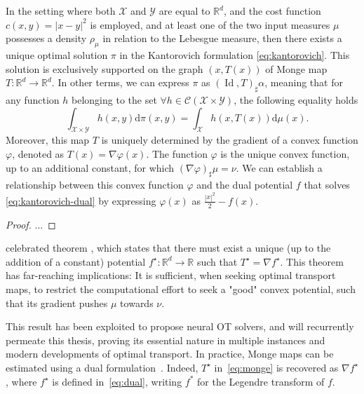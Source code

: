 \begin{theorem} \label{thm:brenier}
	In the setting where both $\mathcal{X}$ and $\mathcal{Y}$ are equal to $\mathbb{R}^d$, and the cost function $c(x, y) = |x-y|^2$ is employed, and at least one of the two input measures $\mu$ possesses a density $\rho_\mu$ in relation to the Lebesgue measure, then there exists a unique optimal solution $\pi$ in the Kantorovich formulation \eqref{eq:kantorovich}.
	This solution is exclusively supported on the graph $(x, T(x))$ of Monge map $T: \mathbb{R}^d \rightarrow \mathbb{R}^d$.
	In other terms, we can express $\pi$ as $(\operatorname{Id}, T)_{\sharp} \alpha$, meaning that for any function $h$ belonging to the set $\forall h \in \mathcal{C}(\mathcal{X} \times \mathcal{Y})$, the following equality holds
	$$
	\quad \int_{\mathcal{X} \times \mathcal{Y}} h(x, y) \mathrm{d} \pi(x, y)=\int_{\mathcal{X}} h(x, T(x)) \mathrm{d} \mu(x).
	$$
Moreover, this map $T$ is uniquely determined by the gradient of a convex function $\varphi$, denoted as $T(x)=\nabla \varphi(x)$. The function $\varphi$ is the unique convex function, up to an additional constant, for which $(\nabla \varphi)_{\sharp} \mu=\nu$. We can establish a relationship between this convex function $\varphi$ and the dual potential $f$ that solves \eqref{eq:kantorovich-dual} by expressing $\varphi(x)$ as $\frac{|x|^2}{2}-f(x)$.
\end{theorem}
\begin{proof}
	...
\end{proof}

celebrated \citeauthor{brenier1987decomposition} theorem \citeyearpar{brenier1987decomposition}, which states that there must exist  a unique (up to the addition of a constant) potential $f^\star:\mathbb{R}^d\rightarrow \mathbb{R}$ such that $T^\star = \nabla f^\star$. 
This theorem has far-reaching implications: It is sufficient, when seeking optimal transport maps, to restrict the computational effort to seek a "good" convex potential, such that its gradient pushes $\mu$ towards $\nu$. 

This result has been exploited to propose neural OT solvers, and  will recurrently permeate this thesis, proving its essential nature in multiple instances and modern developments of optimal transport.
In practice, Monge maps can be estimated using a dual formulation~\citep{makkuva2020optimal, korotin2020wasserstein, bunne2022proximal, alvarez2022optimizing, mokrov2021large}. 
Indeed, $T^\star$ in~\eqref{eq:monge} is recovered as $\nabla f^\star$, where $f^\star$ is defined in~\eqref{eq:dual}, writing $f^*$ for the Legendre transform of $f$.

